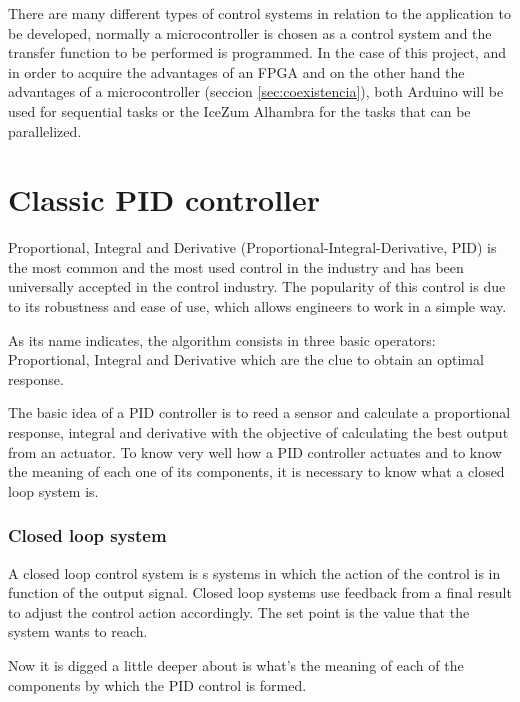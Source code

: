 There are many different types of control systems in relation to the application to be developed, normally a microcontroller is chosen as a control system and the transfer function to be performed is programmed.\newline
In the case of this project, and in order to acquire the advantages of an FPGA and on the other hand the advantages of a microcontroller (seccion \ref{sec:coexistencia}), both Arduino will be used for sequential tasks or the IceZum Alhambra for the tasks that can be parallelized. \newline
\section{Classic PID controller}\label{sec:PID}

Proportional, Integral and Derivative\cite{nemadesign} (Proportional-Integral-Derivative, PID) is the most common and the most used control in the industry and has been universally accepted in the control industry. The popularity of this control is due to its robustness and ease of use, which allows engineers to work in a simple way. \newline

As its name indicates, the algorithm consists in three basic operators: Proportional, Integral and Derivative which are the clue to obtain an optimal response. \newline

The basic idea of a PID controller is to reed a sensor and calculate a proportional response, integral and derivative with the objective of calculating the best output from an actuator. \newline
\newpage
To know very well how a PID controller actuates and to know the meaning of each one of its components, it is necessary to know what a closed loop system is. 

\subsubsection{Closed loop system}
A closed loop control system is s systems in which the action of the control is in function of the output signal. Closed loop systems use feedback from a final result to adjust the control action accordingly. The set point is the value that the system wants to reach. \newline

Now it is digged a little deeper about is what’s the meaning of each of the components by which the PID control is formed.\newline
